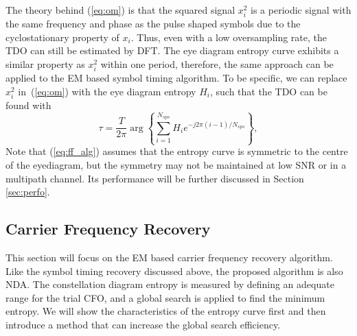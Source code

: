 \documentclass[journal,comsoc, onecolumn, 12pt,draftclsnofoot]{IEEEtran} %
\begin{document}
The theory behind (\ref{eq:om}) is that the squared signal \(x_i^2\) is a periodic signal with the same frequency and phase as the pulse shaped symbols due to the cyclostationary property of \(x_i\).
Thus, even with a low oversampling rate, the TDO can still be estimated by DFT.
The eye diagram entropy curve exhibits a similar property as \(x_i^2\) within one period,
therefore, the same approach can be applied to the EM based symbol timing algorithm.
% 
% 
To be specific, we can replace \(x_i^2\) in~(\ref{eq:om}) with the eye diagram entropy \(H_i\), 
such that the TDO can be found with
\begin{equation}
\tau  = \frac{T}{{2\pi }}\arg \left\{ {\sum\limits_{i = 1}^{N_{sps}} {H_i{e^{ - j2\pi (i-1)/N_{sps}}}} } \right\},
\label{eq:ff_alg}
\end{equation}
Note that (\ref{eq:ff_alg}) assumes that the entropy curve is symmetric to the centre of the eyediagram,
but the symmetry may not be maintained at low SNR or in a multipath channel.
Its performance will be further discussed in Section \ref{sec:perfo}.

\subsection{Carrier Frequency Recovery}
\label{sec:carrier_recovery}
This section will focus on the EM based carrier frequency recovery algorithm.
Like the symbol timing recovery discussed above, the proposed algorithm is also NDA.
The constellation diagram entropy is measured by defining an adequate range for the trial CFO, and a global search is applied to find the minimum entropy. 
We will show the characteristics of the entropy curve first and then introduce a method that can increase the global search efficiency. 
\end{document}
